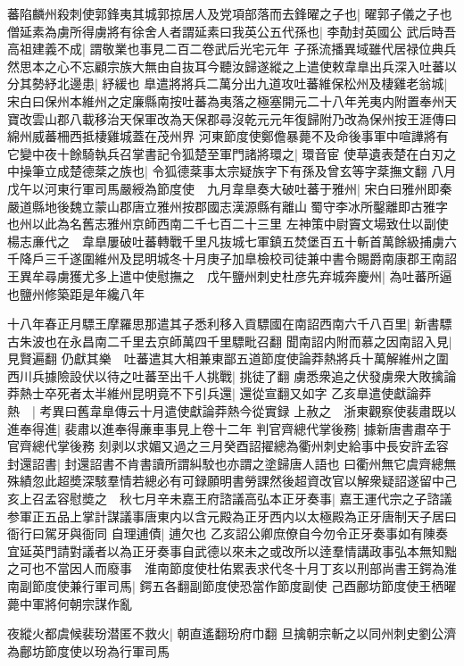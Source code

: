 蕃陷麟州殺刺使郭鋒夷其城郭掠居人及党項部落而去鋒曜之子也|{
	曜郭子儀之子也}
僧延素為虜所得虜將有徐舍人者謂延素曰我英公五代孫也|{
	李勣封英國公}
武后時吾高祖建義不成|{
	謂敬業也事見二百二卷武后光宅元年}
子孫流播異域雖代居禄位典兵然思本之心不忘顧宗族大無由自抜耳今聽汝歸遂縱之上遣使敕韋臯出兵深入吐蕃以分其勢紓北邊患|{
	紓緩也}
臯遣將將兵二萬分出九道攻吐蕃維保松州及棲雞老翁城|{
	宋白曰保州本維州之定廉縣南按吐蕃為夷落之極塞開元二十八年羌夷内附置奉州天寶改雲山郡八載移治天保軍改為天保郡尋沒乾元元年復歸附乃改為保州按王涯傳曰綿州威蕃柵西抵棲雞城蓋在茂州界}
河東節度使鄭儋暴薨不及命後事軍中喧譁將有它變中夜十餘騎執兵召掌書記令狐楚至軍門諸將環之|{
	環音宦}
使草遺表楚在白刃之中操筆立成楚德棻之族也|{
	令狐德棻事太宗疑族字下有孫及曾玄等字棻撫文翻}
八月戊午以河東行軍司馬嚴綬為節度使　九月韋臯奏大破吐蕃于雅州|{
	宋白曰雅州即秦嚴道縣地後魏立蒙山郡唐立雅州按郡國志漢源縣有離山蜀守李冰所鑿離即古雅字也州以此為名舊志雅州京師西南二千七百二十三里}
左神策中尉竇文場致仕以副使楊志亷代之　韋臯屢破吐蕃轉戰千里凡抜城七軍鎮五焚堡百五十斬首萬餘級捕虜六千降戶三千遂圍維州及昆明城冬十月庚子加臯檢校司徒兼中書令賜爵南康郡王南詔王異牟尋虜獲尤多上遣中使慰撫之　戊午鹽州刺史杜彦先弃城奔慶州|{
	為吐蕃所逼也鹽州修築距是年纔八年}


十八年春正月驃王摩羅思那遣其子悉利移入貢驃國在南詔西南六千八百里|{
	新書驃古朱波也在永昌南二千里去京師萬四千里驃毗召翻}
聞南詔内附而慕之因南詔入見|{
	見賢遍翻}
仍獻其樂　吐蕃遣其大相兼東鄙五道節度使論莽熱將兵十萬解維州之圍西川兵據險設伏以待之吐蕃至出千人挑戰|{
	挑徒了翻}
虜悉衆追之伏發虜衆大敗擒論莽熱士卒死者太半維州昆明竟不下引兵還|{
	還從宣翻又如字}
乙亥臯遣使獻論莽熱　|{
	考異曰舊韋臯傳云十月遣使獻論莽熱今從實録}
上赦之　浙東觀察使裴肅既以進奉得進|{
	裴肅以進奉得亷車事見上卷十二年}
判官齊總代掌後務|{
	據新唐書肅卒于官齊總代掌後務}
刻剥以求媚又過之三月癸酉詔擢總為衢州刺史給事中長安許孟容封還詔書|{
	封還詔書不肯書讀所謂糾駮也亦謂之塗歸唐人語也}
曰衢州無它虞齊總無殊績忽此超奬深駭羣情若總必有可録願明書勞課然後超資改官以解衆疑詔遂留中己亥上召孟容慰奬之　秋七月辛未嘉王府諮議高弘本正牙奏事|{
	嘉王運代宗之子諮議参軍正五品上掌計謀議事唐東内以含元殿為正牙西内以太極殿為正牙唐制天子居曰衙行曰駕牙與衙同}
自理逋債|{
	逋欠也}
乙亥詔公卿庶僚自今勿令正牙奏事如有陳奏宜延英門請對議者以為正牙奏事自武德以來未之或改所以逹羣情講政事弘本無知黜之可也不當因人而廢事　淮南節度使杜佑累表求代冬十月丁亥以刑部尚書王鍔為淮南副節度使兼行軍司馬|{
	鍔五各翻副節度使恐當作節度副使}
己酉鄜坊節度使王栖曜薨中軍將何朝宗謀作亂

夜縱火都虞候裴玢潜匿不救火|{
	朝直遙翻玢府巾翻}
旦擒朝宗斬之以同州刺史劉公濟為鄜坊節度使以玢為行軍司馬

